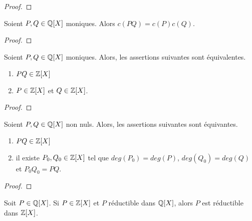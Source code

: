 \ifdefined\outputproof
\begin{proof}

\end{proof}
\fi

\begin{lemma} [Gauss]
	\label{lemma:gauss}
	Soient $P, Q \in \mathbb{Q}[X]$ moniques. Alors $c(PQ) = c(P) c(Q)$.
\end{lemma}

\ifdefined\outputproof
\begin{proof}

\end{proof}
\fi

\begin{corollary}
	Soient $P, Q \in \mathbb{Q}[X]$ moniques. Alors, les assertions suivantes sont
	équivalentes.

	\begin{enumerate}
		\item $PQ \in \mathbb{Z}[X]$
		\item $P \in \mathbb{Z}[X]$ et $Q \in \mathbb{Z}[X]$.
	\end{enumerate}
\end{corollary}

\ifdefined\outputproof
\begin{proof}

\end{proof}
\fi

\begin{corollary}
	Soient $P, Q \in \mathbb{Q}[X]$ non nuls. Alors, les assertions suivantes sont
	équivantes.

	\begin{enumerate}
		\item $PQ \in \mathbb{Z}[X]$
		\item il existe $P_{0}, Q_{0} \in \mathbb{Z}[X]$ tel que $deg(P_{0}) =
			deg(P)$, $deg(Q_{0}) = deg(Q)$ et $P_{0} Q_{0} = PQ$.
	\end{enumerate}
\end{corollary}

\ifdefined\outputproof
\begin{proof}

\end{proof}
\fi

\begin{remarque}
	Soit $P \in \mathbb{Q}[X]$.
	Si $P \in \mathbb{Z}[X]$ et $P$ réductible dans $\mathbb{Q}[X]$, alors $P$ est
	réductible dans $\mathbb{Z}[X]$.
\end{remarque}

